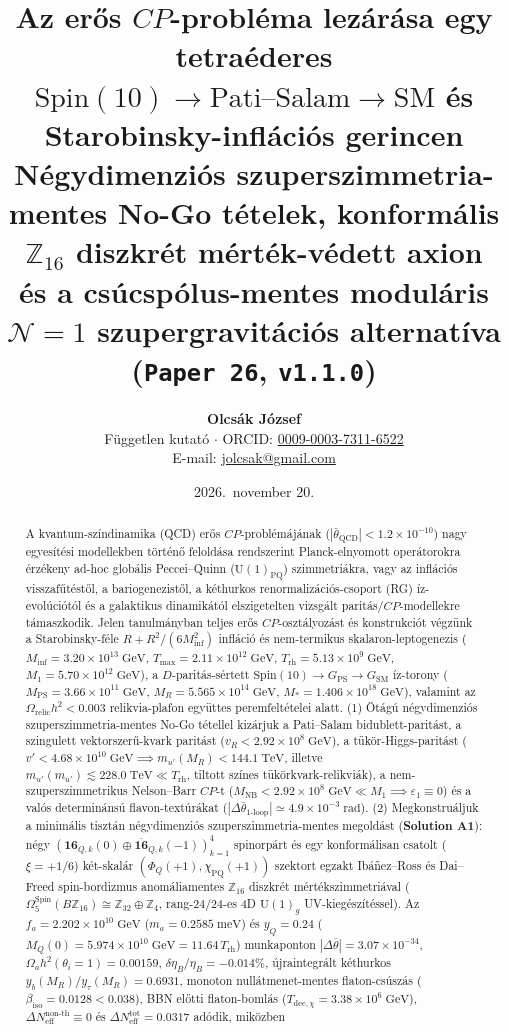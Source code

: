 \documentclass[11pt,a4paper]{article}
\title{\textbf{Az erős \texorpdfstring{$CP$}{CP}-probléma lezárása egy tetraéderes\\
\texorpdfstring{$\mathrm{Spin}(10) \to \mathrm{Pati\text{--}Salam} \to \mathrm{SM}$}{Spin(10) -> Pati-Salam -> SM} és Starobinsky-inflációs gerincen}\\[0.35em]
\large Négydimenziós szuperszimmetria-mentes No-Go tételek, konformális \texorpdfstring{$\mathbb{Z}_{16}$}{Z16} diszkrét mérték-védett axion\\
és a csúcspólus-mentes moduláris \texorpdfstring{$\mathcal{N}=1$}{N=1} szupergravitációs alternatíva (\texttt{Paper 26}, \texttt{v1.1.0})}
\author{\textbf{Olcsák József}\\
\small Független kutató $\cdot$ ORCID: \href{https://orcid.org/0009-0003-7311-6522}{0009-0003-7311-6522}\\
\small E-mail: \href{mailto:jolcsak@gmail.com}{jolcsak@gmail.com}}
\date{2026.\ november 20.}
\begin{document}
\maketitle

\begin{abstract}
\noindent A kvantum-színdinamika (QCD) erős $CP$-problémájának ($|\bar{\theta}_{\mathrm{QCD}}| < 1.2\times 10^{-10}$) nagy egyesítési modellekben történő feloldása rendszerint Planck-elnyomott operátorokra érzékeny ad-hoc globális Peccei--Quinn ($\mathrm{U}(1)_{\mathrm{PQ}}$) szimmetriákra, vagy az inflációs visszafűtéstől, a bariogenezistől, a kéthurkos renormalizációs-csoport (RG) íz-evolúciótól és a galaktikus dinamikától elszigetelten vizsgált paritás/$CP$-modellekre támaszkodik. Jelen tanulmányban teljes erős $CP$-osztályozást és konstrukciót végzünk a Starobinsky-féle $R + R^2/(6 M_{\mathrm{inf}}^2)$ infláció és nem-termikus skalaron-leptogenezis ($M_{\mathrm{inf}} = 3.20\times 10^{13}\;\mathrm{GeV}$, $T_{\max} = 2.11\times 10^{12}\;\mathrm{GeV}$, $T_{\mathrm{rh}} = 5.13\times 10^9\;\mathrm{GeV}$, $M_1 = 5.70\times 10^{12}\;\mathrm{GeV}$), a $D$-paritás-sértett $\mathrm{Spin}(10) \to G_{\mathrm{PS}} \to G_{\mathrm{SM}}$ íz-torony ($M_{\mathrm{PS}} = 3.66\times 10^{11}\;\mathrm{GeV}$, $M_R = 5.565\times 10^{14}\;\mathrm{GeV}$, $M_* = 1.406\times 10^{18}\;\mathrm{GeV}$), valamint az $\Omega_{\mathrm{relic}}h^2 < 0.003$ relikvia-plafon együttes peremfeltételei alatt. (1) Ötágú négydimenziós szuperszimmetria-mentes No-Go tétellel kizárjuk a Pati--Salam bidublett-paritást, a szingulett vektorszerű-kvark paritást ($v_R < 2.92\times 10^8\;\mathrm{GeV}$), a tükör-Higgs-paritást ($v' < 4.68\times 10^{10}\;\mathrm{GeV} \implies m_{u'}(M_R) < 144.1\;\mathrm{TeV}$, illetve $m_{u'}(m_{u'}) \lesssim 228.0\;\mathrm{TeV} \ll T_{\mathrm{rh}}$, tiltott színes tükörkvark-relikviák), a nem-szuperszimmetrikus Nelson--Barr $CP$-t ($M_{\mathrm{NB}} < 2.92\times 10^8\;\mathrm{GeV} \ll M_1 \implies \varepsilon_1 \equiv 0$) és a valós determinánsú flavon-textúrákat ($|\Delta\bar{\theta}_{\text{1-loop}}| \simeq 4.9\times 10^{-3}\;\mathrm{rad}$). (2) Megkonstruáljuk a minimális tisztán négydimenziós szuperszimmetria-mentes megoldást (\textbf{Solution A1}): négy $(\mathbf{16}_{Q,k}(0)\oplus\overline{\mathbf{16}}_{Q,k}(-1))_{k=1}^4$ spinorpárt és egy konformálisan csatolt ($\xi = +1/6$) két-skalár $(\Phi_Q(+1),\chi_{\mathrm{PQ}}(+1))$ szektort egzakt Ibáñez--Ross és Dai--Freed spin-bordizmus anomáliamentes $\mathbb{Z}_{16}$ diszkrét mértékszimmetriával ($\Omega_5^{\mathrm{Spin}}(B\mathbb{Z}_{16}) \cong \mathbb{Z}_{32}\oplus\mathbb{Z}_4$, rang-$24/24$-es 4D $\mathrm{U}(1)_g$ UV-kiegészítéssel). Az $f_a = 2.202\times 10^{10}\;\mathrm{GeV}$ ($m_a = 0.2585\;\mathrm{meV}$) és $y_Q = 0.24$ ($M_Q(0) = 5.974\times 10^{10}\;\mathrm{GeV} = 11.64\,T_{\mathrm{rh}}$) munkaponton $|\Delta\bar{\theta}| = 3.07\times 10^{-34}$, $\Omega_a h^2(\theta_i=1) = 0.00159$, $\delta\eta_B/\eta_B = -0.014\%$, újraintegrált kéthurkos $y_b(M_R)/y_\tau(M_R) = 0.6931$, monoton nullátmenet-mentes flaton-csúszás ($\beta_{\mathrm{iso}} = 0.0128 < 0.038$), BBN előtti flaton-bomlás ($T_{\mathrm{dec},\chi} = 3.38\times 10^6\;\mathrm{GeV}$), $\Delta N_{\mathrm{eff}}^{\text{non-th}} \equiv 0$ és $\Delta N_{\mathrm{eff}}^{\mathrm{tot}} = 0.0317$ adódik, miközben 
\end{abstract}
\end{document}
